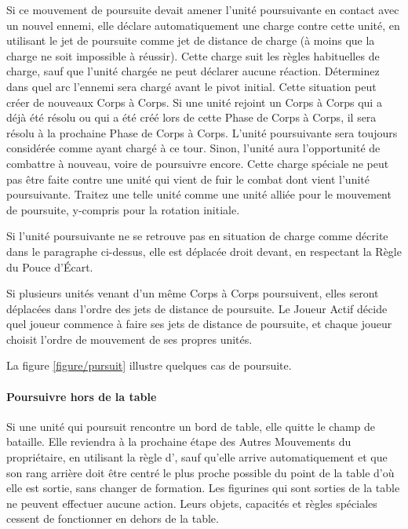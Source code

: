 Si ce mouvement de poursuite devait amener l'unité poursuivante en contact avec un nouvel ennemi, elle déclare automatiquement une charge contre cette unité, en utilisant le jet de poursuite comme jet de distance de charge (à moins que la charge ne soit impossible à réussir). Cette charge suit les règles habituelles de charge, sauf que l'unité chargée ne peut déclarer aucune réaction. Déterminez dans quel arc l'ennemi sera chargé avant le pivot initial. Cette situation peut créer de nouveaux Corps à Corps. Si une unité rejoint un Corps à Corps qui a déjà été résolu ou qui a été créé lors de cette Phase de Corps à Corps, il sera résolu à la prochaine Phase de Corps à Corps. L'unité poursuivante sera toujours considérée comme ayant chargé à ce tour. Sinon, l'unité aura l'opportunité de combattre à nouveau, voire de poursuivre encore. Cette charge spéciale ne peut pas être faite contre une unité qui vient de fuir le combat dont vient l'unité poursuivante. Traitez une telle unité comme une unité alliée pour le mouvement de poursuite, y-compris pour la rotation initiale.

Si l'unité poursuivante ne se retrouve pas en situation de charge comme décrite dans le paragraphe ci-dessus, elle est déplacée droit devant, en respectant la Règle du Pouce d'Écart. 

Si plusieurs unités venant d'un même Corps à Corps poursuivent, elles seront déplacées dans l'ordre des jets de distance de poursuite. Le Joueur Actif décide quel joueur commence à faire ses jets de distance de poursuite, et chaque joueur choisit l'ordre de mouvement de ses propres unités.

La figure \ref{figure/pursuit} illustre quelques cas de poursuite.

\paragraph{Poursuivre hors de la table}

Si une unité qui poursuit rencontre un bord de table, elle quitte le champ de bataille. Elle reviendra à la prochaine étape des Autres Mouvements du propriétaire, en utilisant la règle d'\ambush{}, sauf qu'elle arrive automatiquement et que son rang arrière doit être centré le plus proche possible du point de la table d'où elle est sortie, sans changer de formation. Les figurines qui sont sorties de la table ne peuvent effectuer aucune action. Leurs objets, capacités et règles spéciales cessent de fonctionner en dehors de la table.

